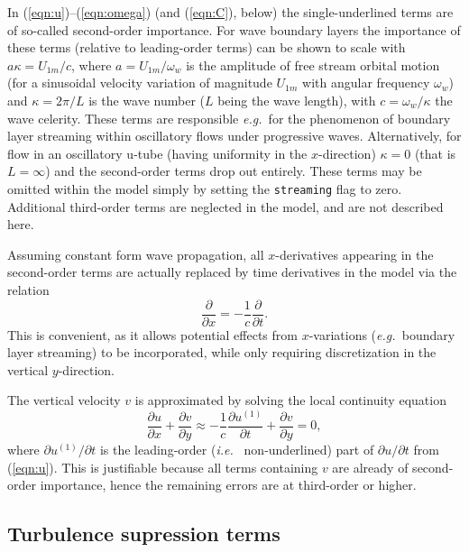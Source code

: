 \documentclass[12pt]{article}
\newcommand{\ie}{{\it i.e.\ }}
\newcommand{\eg}{{\it e.g.\ }}
\begin{document}
In (\ref{eqn:u})--(\ref{eqn:omega}) (and (\ref{eqn:C}), below) the
single-underlined terms are of so-called second-order importance.  For
wave boundary layers the importance of these terms (relative to
leading-order terms) can be shown to scale with $a\kappa=U_{1m}/c$,
where $a=U_{1m}/\omega_w$ is the amplitude of free stream orbital
motion (for a sinusoidal velocity variation of magnitude $U_{1m}$ with
angular frequency $\omega_w$) and $\kappa=2\pi/L$ is the wave number
($L$ being the wave length), with $c=\omega_w/\kappa$ the wave
celerity.  These terms are responsible \eg for the phenomenon of
boundary layer streaming within oscillatory flows under progressive
waves.  Alternatively, for flow in an oscillatory u-tube (having
uniformity in the $x$-direction) $\kappa=0$ (that is $L=\infty$) and
the second-order terms drop out entirely.  These terms may be omitted
within the model simply by setting the \texttt{streaming} flag to
zero.  Additional third-order terms are neglected in the model, and
are not described here.

Assuming constant form wave propagation, all $x$-derivatives appearing
in the second-order terms are actually replaced by time derivatives in
the model via the relation
%
\begin{equation}
\frac{\partial}{\partial x} = - \frac{1}{c}\frac{\partial}{\partial t}.
\end{equation}
%
This is convenient, as it allows potential effects from $x$-variations
(\eg boundary layer streaming) to be incorporated, while only
requiring discretization in the vertical $y$-direction.

The vertical velocity $v$ is approximated by solving the local
continuity equation
%
\begin{equation}
\frac{\partial u}{\partial x} + \frac{\partial v}{\partial y} 
\approx -\frac{1}{c}\frac{\partial u^{(1)}}{\partial t} + \frac{\partial v}{\partial y} 
= 0,
\label{eqn:cont}
\end{equation}
%
where $\partial u^{(1)}/\partial t$ is the leading-order (\ie
non-underlined) part of $\partial u/\partial t$ from (\ref{eqn:u}).
This is justifiable because all terms containing $v$ are already of
second-order importance, hence the remaining errors are at third-order
or higher.


\subsection{Turbulence supression terms}
\label{sec:turbsup}
\end{document}
